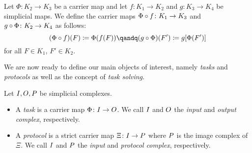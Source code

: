 \begin{thDef}
    Let $\Phi\colon K_2\to K_3$ be a carrier map and let
    $f\colon K_1\to K_2$ and $g\colon K_3\to K_4$ be simplicial
    maps. We define the carrier maps
    $\Phi\after f\colon K_1\to K_3$ and $g\after\Phi\colon K_2\to K_4$
    as follows:
    \[ (\Phi\after f)(F) \defeq \Phi(f(F))
        \qandq
        (g\after \Phi)(F') \defeq g[\Phi(F')]
    \]
    for all $F\in K_1$, $F'\in K_2$.
\end{thDef}

We are now ready to define our main objects of interest, namely \emph{tasks}
and \emph{protocols} as well as the concept of \emph{task solving}.

\begin{thDef}
    \label{ch2:def:taskprotocol}
    Let $I,O,P$ be simplicial complexes.
    \begin{itemize}
        \item
            A \emph{task} is a carrier map $\Phi\colon I\to O$.
            We call $I$ and $O$ the \emph{input} and \emph{output complex},
            respectively.
            
        \item
            A \emph{protocol} is a strict carrier map $\Xi\colon I\to P$
            where $P$ is the image complex of~$\Xi$.
            We call $I$ and $P$ the \emph{input} and \emph{protocol
            complex}, respectively.
    \end{itemize}
\end{thDef}

